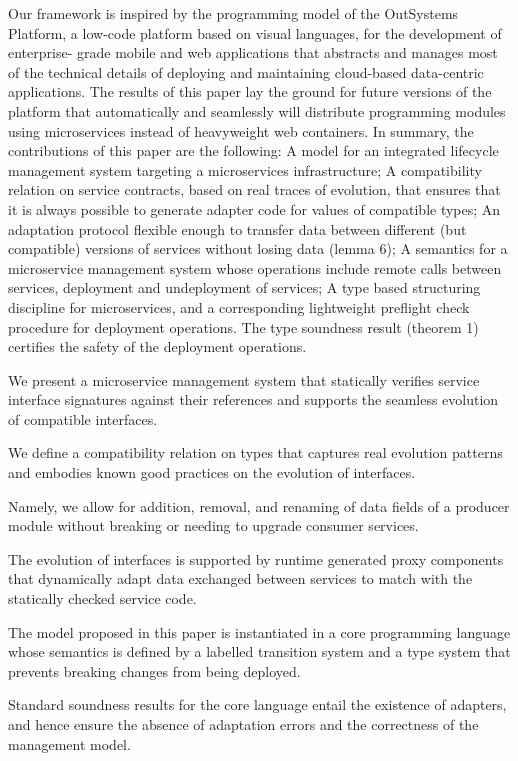 Our framework is inspired by the programming model of the OutSystems Platform,
a low-code platform based on visual languages, for the development of enterprise-
grade mobile and web applications that abstracts and manages most of the technical
details of deploying and maintaining cloud-based data-centric applications. The results
of this paper lay the ground for future versions of the platform that automatically
and seamlessly will distribute programming modules using microservices instead of
heavyweight web containers.
In summary, the contributions of this paper are the following:
A model for an integrated lifecycle management system targeting a microservices
infrastructure;
A compatibility relation on service contracts, based on real traces of evolution, that
ensures that it is always possible to generate adapter code for values of compatible
types;
An adaptation protocol flexible enough to transfer data between different (but
compatible) versions of services without losing data (lemma 6);
A semantics for a microservice management system whose operations include
remote calls between services, deployment and undeployment of services;
A type based structuring discipline for microservices, and a corresponding lightweight
preflight check procedure for deployment operations. The type soundness result
(theorem 1) certifies the safety of the deployment operations.


We present a microservice management system that statically verifies service interface signatures against
their references and supports the seamless evolution of compatible interfaces.

We define a compatibility relation on types that captures real evolution patterns and embodies known good practices on the evolution of
interfaces.

Namely, we allow for addition, removal, and renaming of data fields of a producer module without
breaking or needing to upgrade consumer services.

The evolution of interfaces is supported by runtime generated proxy components that dynamically adapt data exchanged between services to match with the statically
checked service code.

The model proposed in this paper is instantiated in a core programming language whose semantics is
defined by a labelled transition system and a type system that prevents breaking changes from being deployed.

Standard soundness results for the core language entail the existence of adapters, and hence ensure the
absence of adaptation errors and the correctness of the management model.

